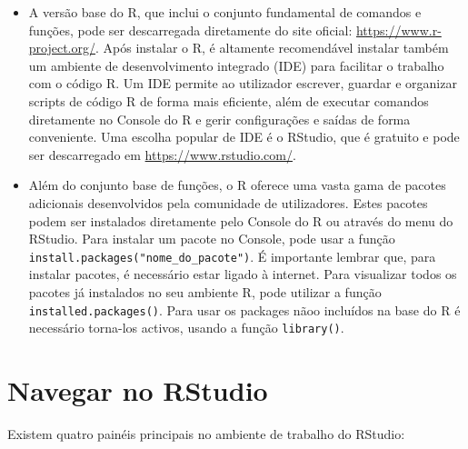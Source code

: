 \documentclass[
]{book}
\begin{document}
\begin{itemize}
\item
  A versão base do R, que inclui o conjunto fundamental de comandos e
  funções, pode ser descarregada diretamente do site oficial:
  \url{https://www.r-project.org/}. Após instalar o R, é altamente
  recomendável instalar também um ambiente de desenvolvimento
  integrado (IDE) para facilitar o trabalho com o código R. Um IDE
  permite ao utilizador escrever, guardar e organizar scripts de
  código R de forma mais eficiente, além de executar comandos
  diretamente no Console do R e gerir configurações e saídas de forma
  conveniente. Uma escolha popular de IDE é o RStudio, que é gratuito
  e pode ser descarregado em \url{https://www.rstudio.com/}.
\item
  Além do conjunto base de funções, o R oferece uma vasta gama de
  pacotes adicionais desenvolvidos pela comunidade de utilizadores.
  Estes pacotes podem ser instalados diretamente pelo Console do R ou
  através do menu do RStudio. Para instalar um pacote no Console, pode
  usar a função \texttt{install.packages("nome\_do\_pacote")}. É importante
  lembrar que, para instalar pacotes, é necessário estar ligado à
  internet. Para visualizar todos os pacotes já instalados no seu
  ambiente R, pode utilizar a função \texttt{installed.packages()}. Para usar
  os packages nãoo incluídos na base do R é necessário torna-los
  activos, usando a função \texttt{library()}.
\end{itemize}

\section{Navegar no RStudio}\label{navegar-no-rstudio}

Existem quatro painéis principais no ambiente de trabalho do RStudio:
\end{document}
